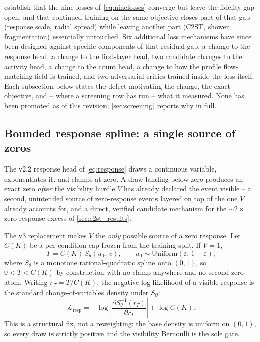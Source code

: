 \documentclass[10pt,a4paper]{article}
\begin{document}
 establish that the nine losses of \cref{eq:ninelosses} converge but leave the fidelity gap open, and that continued training on the same objective closes part of that gap (response scale, radial spread) while leaving another part (C2ST, shower fragmentation) essentially untouched. Six additional loss mechanisms have since been designed against specific components of that residual gap: a change to the response head, a change to the first-layer head, two candidate changes to the activity head, a change to the count head, a change to how the profile flow-matching field is trained, and two adversarial critics trained inside the loss itself. Each subsection below states the defect motivating the change, the exact objective, and -- where a screening row has run -- what it measured. None has been promoted as of this revision; \cref{sec:screening} reports why in full.

\subsection{Bounded response spline: a single source of zeros}
\label{sec:response_spline}
The v2.2 response head of \cref{eq:response} draws a continuous variable, exponentiates it, and clamps at zero. A draw landing below zero produces an exact zero \emph{after} the visibility hurdle $V$ has already declared the event visible -- a second, unintended source of zero-response events layered on top of the one $V$ already accounts for, and a direct, verified candidate mechanism for the $\sim2\times$ zero-response excess of \cref{sec:c2st_results}.

The v3 replacement makes $V$ the \emph{only} possible source of a zero response. Let $C(K)$ be a per-condition cap frozen from the training split. If $V=1$,
\begin{equation}
T = C(K)\, S_\theta(u_0;\, c), \qquad u_0 \sim \mathrm{Uniform}(\varepsilon,\, 1-\varepsilon),
\label{eq:response_spline_sample}
\end{equation}
where $S_\theta$ is a monotone rational-quadratic spline onto $(0,1)$, so $0 < T < C(K)$ by construction with no clamp anywhere and no second zero atom. Writing $r_T = T/C(K)$, the negative log-likelihood of a visible response is the standard change-of-variables density under $S_\theta$:
\begin{equation}
\mathcal{L}_{\mathrm{resp}} = -\log\left|\frac{\partial S_\theta^{-1}(r_T)}{\partial r_T}\right| + \log C(K).
\label{eq:response_spline_nll}
\end{equation}
This is a structural fix, not a reweighting: the base density is uniform on $(0,1)$, so every draw is strictly positive and the visibility Bernoulli is the sole gate.
\end{document}
